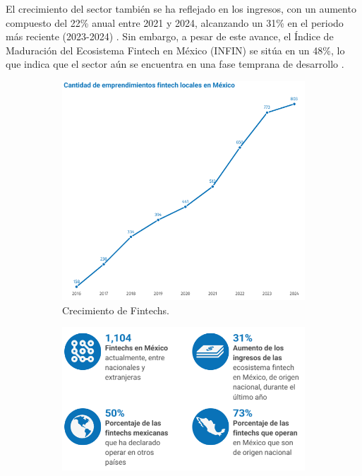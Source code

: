 \vspace{0.3cm}

El crecimiento del sector también se ha reflejado en los ingresos, con un aumento compuesto del 22\% anual entre 2021 y 2024, alcanzando un 31\% en el periodo más reciente (2023-2024) \cite{reporteindigo2024}. Sin embargo, a pesar de este avance, el Índice de Maduración del Ecosistema Fintech en México (INFIN) se sitúa en un 48\%, lo que indica que el sector aún se encuentra en una fase temprana de desarrollo \cite{santander2024}.

\begin{figure}[h!]
    \centering
    \begin{subfigure}[b]{0.45\textwidth} %
        \centering
        \includegraphics[scale=0.5]{Figuras/crecimientofintec.png} %
        \caption{Crecimiento de Fintechs.}
        \label{fig:crecfintechs}
    \end{subfigure}
    \hspace{0.005\textwidth} %
    \begin{subfigure}[b]{0.45\textwidth} %
        \centering
        \includegraphics[scale=0.5]{Figuras/datosmercado.png} %

\end{subfigure}
\end{figure}
